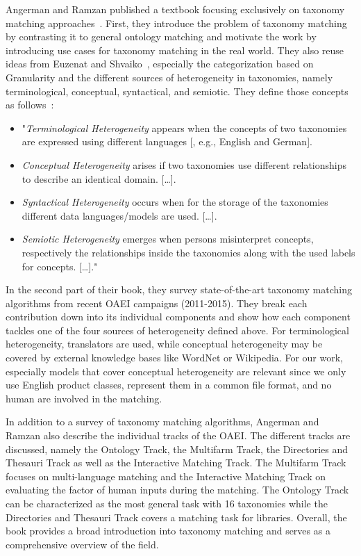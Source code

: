 Angerman and Ramzan published a textbook focusing exclusively on taxonomy matching approaches~\cite{angermann2017taxonomy}.
First, they introduce the problem of taxonomy matching by contrasting it to general ontology matching and motivate the work by introducing
use cases for taxonomy matching in the real world.
They also reuse ideas from Euzenat and Shvaiko~\cite{euzenat2007ontology}, especially the categorization based on Granularity
and the different sources of heterogeneity in taxonomies, namely terminological, conceptual, syntactical, and semiotic.
They define those concepts as follows~\cite[p.18]{angermann2017taxonomy}:
\begin{itemize}
    \item "\emph{Terminological Heterogeneity} appears when the concepts of two taxonomies are expressed using different languages [, e.g., English and German].
    \item \emph{Conceptual Heterogeneity} arises if two taxonomies use different relationships to describe an identical domain. [\ldots].
    \item \emph{Syntactical Heterogeneity} occurs when for the storage of the taxonomies different data languages/models are used. [\ldots].
    \item \emph{Semiotic Heterogeneity} emerges when persons misinterpret concepts, respectively the relationships inside the taxonomies along with the used labels for concepts. [\ldots]."
\end{itemize}
In the second part of their book, they survey state-of-the-art taxonomy matching algorithms from recent
OAEI campaigns (2011-2015).
They break each contribution down into its individual components and show how each component tackles one of the four sources
of heterogeneity defined above.
For terminological heterogeneity, translators are used, while conceptual heterogeneity may be covered by external knowledge
bases like WordNet or Wikipedia.
For our work, especially models that cover conceptual heterogeneity are relevant since we only use English product classes,
represent them in a common file format, and no human are involved in the matching.

In addition to a survey of taxonomy matching algorithms, Angerman and Ramzan also describe the individual tracks of the
OAEI\@.
The different tracks are discussed, namely the Ontology Track, the Multifarm Track, the Directories and Thesauri Track
as well as the Interactive Matching Track.
The Multifarm Track focuses on multi-language matching and the Interactive Matching Track on evaluating  the factor of
human inputs during the matching.
The Ontology Track can be characterized as the most general task with 16 taxonomies while the Directories and Thesauri
Track covers a matching task for libraries.
Overall, the book provides a broad introduction into taxonomy matching and serves as a comprehensive overview of the field.

